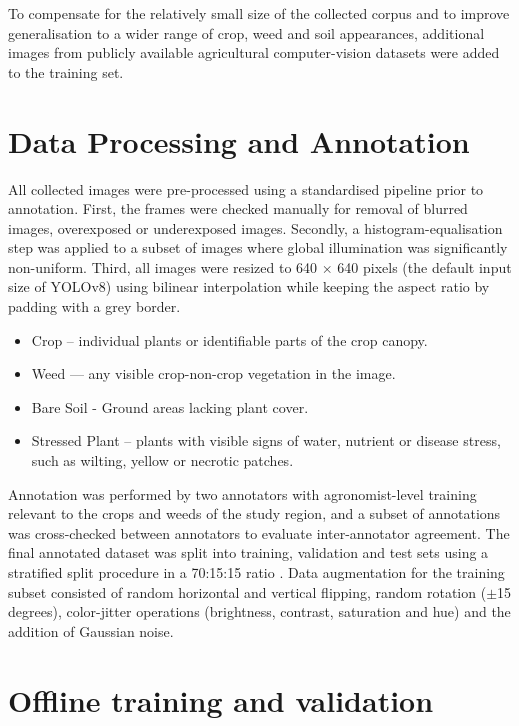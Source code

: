 \documentclass[12pt,a4paper]{report}
\begin{document}
To compensate for the relatively small size of the collected corpus and to improve generalisation to a wider range of crop, weed and soil appearances, additional images from publicly available agricultural computer-vision datasets were added to the training set.

\section{Data Processing and Annotation}

All collected images were pre-processed using a standardised pipeline prior to annotation. First, the frames were checked manually for removal of blurred images, overexposed or underexposed images. Secondly, a histogram-equalisation step was applied to a subset of images where global illumination was significantly non-uniform. Third, all images were resized to 640 $\times$ 640 pixels (the default input size of YOLOv8) using bilinear interpolation while keeping the aspect ratio by padding with a grey border.

\begin{itemize}
    \item Crop -- individual plants or identifiable parts of the crop canopy.
    \item Weed --- any visible crop-non-crop vegetation in the image.
    \item Bare Soil - Ground areas lacking plant cover.
    \item Stressed Plant -- plants with visible signs of water, nutrient or disease stress, such as wilting, yellow or necrotic patches.
\end{itemize}

Annotation was performed by two annotators with agronomist-level training relevant to the crops and weeds of the study region, and a subset of annotations was cross-checked between annotators to evaluate inter-annotator agreement. The final annotated dataset was split into training, validation and test sets using a stratified split procedure in a 70:15:15 ratio . Data augmentation for the training subset consisted of random horizontal and vertical flipping, random rotation ($\pm$15 degrees), color-jitter operations (brightness, contrast, saturation and hue) and the addition of Gaussian noise.

\section{Offline training and validation}
\end{document}
